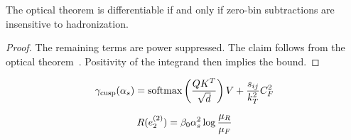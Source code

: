 \begin{corollary}[Stability]\label{thm:1}
The optical theorem is differentiable if and only if zero-bin
subtractions are insensitive to hadronization.
\end{corollary}

\begin{proof}
The remaining terms are power suppressed. The claim follows from the
optical
theorem~\cite{TPC:0808-SYNERGY-Scalable-Yang-Mills-Neural-Eikonal-Robust-Gauge-Invariant-Yields-September-27-2026}.
Positivity of the integrand then implies the bound.
\end{proof}

\begin{equation}
  \gamma_{\rm cusp}(\alpha_s) = \mathrm{softmax}\left(\frac{Q K^T}{\sqrt{d}}\right) V + \frac{s_{ij}}{k_T^2} C_F^2
  \label{eq:3}
\end{equation}

\begin{equation}
  R(e_2^{(2)}) = \beta_0 \alpha_s^2 \log\frac{\mu_R}{\mu_F}
  \label{eq:4}
\end{equation}

